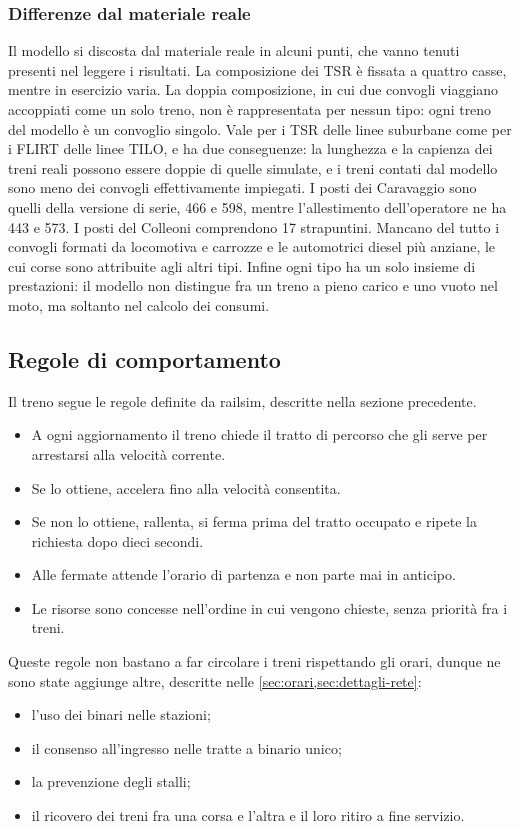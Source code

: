 \subsubsection{Differenze dal materiale reale}
Il modello si discosta dal materiale reale in alcuni punti, che vanno tenuti presenti nel leggere i risultati. La composizione dei TSR è fissata a quattro casse, mentre in esercizio varia. La doppia composizione, in cui due convogli viaggiano accoppiati come un solo treno, non è rappresentata per nessun tipo: ogni treno del modello è un convoglio singolo. Vale per i TSR delle linee suburbane come per i FLIRT delle linee TILO, e ha due conseguenze: la lunghezza e la capienza dei treni reali possono essere doppie di quelle simulate, e i treni contati dal modello sono meno dei convogli effettivamente impiegati. I posti dei Caravaggio sono quelli della versione di serie, 466 e 598, mentre l'allestimento dell'operatore ne ha 443 e 573. I posti del Colleoni comprendono 17 strapuntini. Mancano del tutto i convogli formati da locomotiva e carrozze e le automotrici diesel più anziane, le cui corse sono attribuite agli altri tipi. Infine ogni tipo ha un solo insieme di prestazioni: il modello non distingue fra un treno a pieno carico e uno vuoto nel moto, ma soltanto nel calcolo dei consumi.

\subsection{Regole di comportamento}
Il treno segue le regole definite da railsim, descritte nella sezione precedente.
\begin{itemize}
	\item A ogni aggiornamento il treno chiede il tratto di percorso che gli serve per arrestarsi alla velocità corrente.
	\item Se lo ottiene, accelera fino alla velocità consentita.
	\item Se non lo ottiene, rallenta, si ferma prima del tratto occupato e ripete la richiesta dopo dieci secondi.
	\item Alle fermate attende l'orario di partenza e non parte mai in anticipo.
	\item Le risorse sono concesse nell'ordine in cui vengono chieste, senza priorità fra i treni.
\end{itemize}

Queste regole non bastano a far circolare i treni rispettando gli orari, dunque ne sono state aggiunge altre, descritte nelle \cref{sec:orari,sec:dettagli-rete}:
\begin{itemize}
	\item l'uso dei binari nelle stazioni;
	\item il consenso all'ingresso nelle tratte a binario unico;
	\item la prevenzione degli stalli;
	\item il ricovero dei treni fra una corsa e l'altra e il loro ritiro a fine servizio.
\end{itemize}

